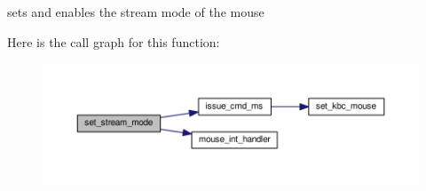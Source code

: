 sets and enables the stream mode of the mouse 



Here is the call graph for this function\+:
\nopagebreak
\begin{figure}[H]
\begin{center}
\leavevmode
\includegraphics[width=350pt]{group__mouse_gabf86ae410ee145ab149b704b7c09d4a0_cgraph}
\end{center}
\end{figure}


